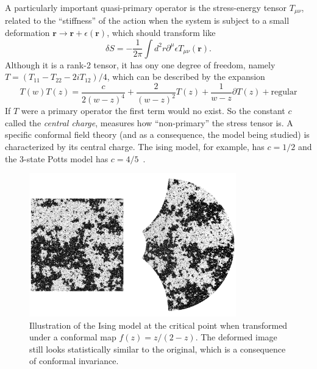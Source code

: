 A particularly important quasi-primary operator is the stress-energy tensor
$T_{\mu\nu}$,
related to the ``stiffness'' of the action when the system is subject to a small
deformation $\mathbf{r}\rightarrow \mathbf{r} + \epsilon(\mathbf{r})$, which
should transform like
\begin{equation}
    \delta S=
    -\frac{1}{2\pi}
    \int d^{2}r\partial^{\mu}\epsilon T_{\mu\nu}\left(\mathbf{r}\right).
\end{equation}
Although it is a rank-2 tensor, it has ony one degree of freedom, namely
$T=(T_{11}-T_{22}-2iT_{12})/4$, which can be described by the expansion
\begin{equation}
    T\left(w\right)T\left(z\right)=
    \frac{c}{2{\left(w-z\right)}^{4}}+
    \frac{2}{{\left(w-z\right)}^{2}}T\left(z\right)+
    \frac{1}{w-z}\partial T\left(z\right)+\mbox{regular}
\end{equation}
If $T$ were a primary operator the first term would no exist. So the constant
$c$ called the \textit{central charge}, measures how ``non-primary'' the stress
tensor is. A specific conformal field theory (and as a consequence, the model
being studied) is characterized by its central charge. The ising model, for
example, has $c=1/2$ and the 3-state Potts model has
$c=4/5$~\cite{Francesco1997}.

\begin{figure}
\begin{center}
    \includegraphics[width=0.8\textwidth]{chapters/ch3-conf/figs/isingcm}
\end{center}
\caption{Illustration of the Ising model at the critical point when transformed
    under a conformal map $f(z)=z/(2-z)$. The deformed image still looks
    statistically similar to the original, which is a consequence of conformal
    invariance.}
\label{fig:isingcm}
\end{figure}

